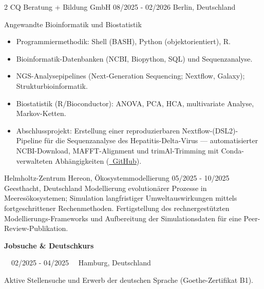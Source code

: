 \documentclass{thejus_cv}
\begin{document}
\begin{paracol}{2}
             {CQ Beratung + Bildung GmbH}
             {08/2025 - 02/2026}
             {Berlin, Deutschland}
             {Angewandte Bioinformatik und Biostatistik
             \begin{itemize}\setlength{\itemsep}{0pt}\setlength{\parskip}{0pt}
                 \item Programmiermethodik: Shell (BASH), Python (objektorientiert), R.
                 \item Bioinformatik-Datenbanken (NCBI, Biopython, SQL) und Sequenzanalyse.
                 \item NGS-Analysepipelines (Next-Generation Sequencing; Nextflow, Galaxy); Strukturbioinformatik.
                 \item Biostatistik (R/Bioconductor): ANOVA, PCA, HCA, multivariate Analyse, Markov-Ketten.
                 \item Abschlussprojekt: Erstellung einer reproduzierbaren Nextflow-(DSL2)-Pipeline f\"ur die Sequenzanalyse des Hepatitis-Delta-Virus --- automatisierter NCBI-Download, MAFFT-Alignment und trimAl-Trimming mit Conda-verwalteten Abh\"angigkeiten (\href{https://github.com/thejusmahajan/hepatitis-delta-pipeline}{\faGithub\ GitHub}).
             \end{itemize}\vspace{0.7em}}

             {Helmholtz-Zentrum Hereon, \"Okosystemmodellierung}
             {05/2025 - 10/2025}
             {Geesthacht, Deutschland}
             {Modellierung evolution\"arer Prozesse in Meeres\"okosystemen; Simulation langfristiger Umweltauswirkungen mittels fortgeschrittener Rechenmethoden. Fertigstellung des rechnergest\"utzten Modellierungs-Frameworks und Aufbereitung der Simulationsdaten f\"ur eine Peer-Review-Publikation.\vspace{0.7em}}

\vspace{0.7em}
{\large\textbf{Jobsuche \& Deutschkurs}}\par
{\small\color{cvgray}\faCalendar\ \ 02/2025 - 04/2025 \hspace{0.5cm} \faMapMarker\ \ Hamburg, Deutschland}\par
\vspace{0.2em}
{\color{cvlightgray}\hdashrule{\linewidth}{0.5pt}{1mm}}\par
\vspace{0.2em}
Aktive Stellensuche und Erwerb der deutschen Sprache (Goethe-Zertifikat B1).
\vspace{0.3em}


\end{paracol}
\end{document}
